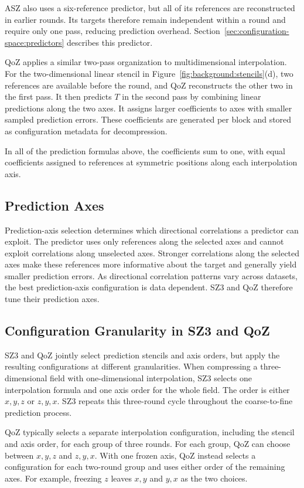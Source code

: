 ASZ also uses a six-reference predictor, but all of its references are reconstructed in earlier rounds. Its targets therefore remain independent within a round and require only one pass, reducing prediction overhead. Section~\ref{sec:configuration-space:predictors} describes this predictor.

QoZ applies a similar two-pass organization to multidimensional interpolation. For the two-dimensional linear stencil in Figure~\ref{fig:background:stencils}(d), two references are available before the round, and QoZ reconstructs the other two in the first pass. It then predicts $T$ in the second pass by combining linear predictions along the two axes. It assigns larger coefficients to axes with smaller sampled prediction errors. These coefficients are generated per block and stored as configuration metadata for decompression.

In all of the prediction formulas above, the coefficients sum to one, with equal coefficients assigned to references at symmetric positions along each interpolation axis.

\subsection{Prediction Axes}
\label{sec:background:prediction-axes}

Prediction-axis selection determines which directional correlations a predictor can exploit. The predictor uses only references along the selected axes and cannot exploit correlations along unselected axes. Stronger correlations along the selected axes make these references more informative about the target and generally yield smaller prediction errors. As directional correlation patterns vary across datasets, the best prediction-axis configuration is data dependent. SZ3 and QoZ therefore tune their prediction axes.

\subsection{Configuration Granularity in SZ3 and QoZ}
\label{sec:background:configuration-granularity}

SZ3 and QoZ jointly select prediction stencils and axis orders, but apply the resulting configurations at different granularities. When compressing a three-dimensional field with one-dimensional interpolation, SZ3 selects one interpolation formula and one axis order for the whole field. The order is either $x,y,z$ or $z,y,x$. SZ3 repeats this three-round cycle throughout the coarse-to-fine prediction process.

QoZ typically selects a separate interpolation configuration, including the stencil and axis order, for each group of three rounds. For each group, QoZ can choose between $x,y,z$ and $z,y,x$. With one frozen axis, QoZ instead selects a configuration for each two-round group and uses either order of the remaining axes. For example, freezing $z$ leaves $x,y$ and $y,x$ as the two choices.
